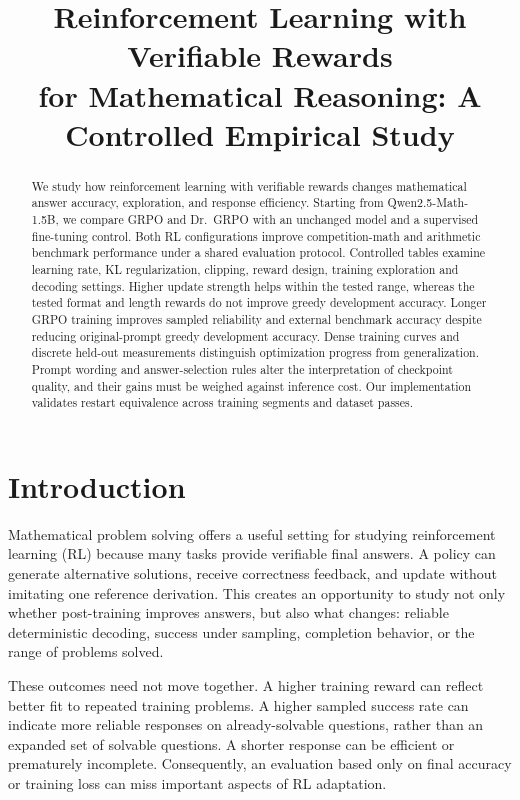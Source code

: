\documentclass[conference]{IEEEtran}
\title{Reinforcement Learning with Verifiable Rewards\\for Mathematical Reasoning: A Controlled Empirical Study}
\author{
\IEEEauthorblockN{Tuan Minh Pham, Tri Vo, Yahor Lechanka}
\IEEEauthorblockA{Purdue University\\CS 557 -- Final Project Report Draft}
}
\begin{document}
\maketitle

\begin{abstract}
We study how reinforcement learning with verifiable rewards changes mathematical answer accuracy, exploration, and response efficiency. Starting from Qwen2.5-Math-1.5B, we compare GRPO and Dr.~GRPO with an unchanged model and a supervised fine-tuning control. Both RL configurations improve competition-math and arithmetic benchmark performance under a shared evaluation protocol. Controlled tables examine learning rate, KL regularization, clipping, reward design, training exploration and decoding settings. Higher update strength helps within the tested range, whereas the tested format and length rewards do not improve greedy development accuracy. Longer GRPO training improves sampled reliability and external benchmark accuracy despite reducing original-prompt greedy development accuracy. Dense training curves and discrete held-out measurements distinguish optimization progress from generalization. Prompt wording and answer-selection rules alter the interpretation of checkpoint quality, and their gains must be weighed against inference cost. Our implementation validates restart equivalence across training segments and dataset passes.
\end{abstract}

\section{Introduction}
Mathematical problem solving offers a useful setting for studying reinforcement learning (RL) because many tasks provide verifiable final answers. A policy can generate alternative solutions, receive correctness feedback, and update without imitating one reference derivation. This creates an opportunity to study not only whether post-training improves answers, but also what changes: reliable deterministic decoding, success under sampling, completion behavior, or the range of problems solved.

These outcomes need not move together. A higher training reward can reflect better fit to repeated training problems. A higher sampled success rate can indicate more reliable responses on already-solvable questions, rather than an expanded set of solvable questions. A shorter response can be efficient or prematurely incomplete. Consequently, an evaluation based only on final accuracy or training loss can miss important aspects of RL adaptation.
\end{document}
